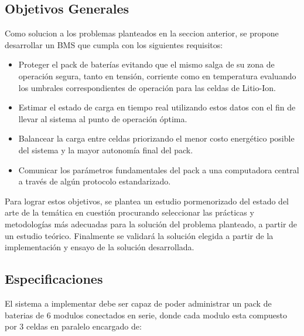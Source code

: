 \documentclass[10pt,a4paper]{article}
\begin{document}
	\subsection{Objetivos Generales}

    Como solucion a los problemas planteados en la seccion anterior, se propone
	desarrollar un BMS que cumpla con los siguientes requisitos:

    \begin{itemize}
        \item Proteger el pack de baterías evitando que el mismo salga de su 
        zona de operación segura, tanto en tensión, corriente como en 
        temperatura evaluando los umbrales correspondientes de operación para 
        las celdas de Litio-Ion.
        \item Estimar el estado de carga en tiempo real utilizando estos datos 
        con el fin de llevar al sistema al punto de operación óptima.
        \item Balancear la carga entre celdas priorizando el menor costo 
        energético posible del sistema y la mayor autonomía final del pack.
        \item Comunicar los parámetros fundamentales del pack a una computadora 
        central a través de algún protocolo estandarizado.
    \end{itemize}

	\noindent Para lograr estos objetivos, se plantea un estudio pormenorizado 
    del estado del arte de la temática en cuestión procurando seleccionar las 
    prácticas y metodologías más adecuadas para la solución del problema 
    planteado, a partir de un estudio teórico. Finalmente se validará la 
    solución elegida a partir de la implementación y ensayo de la solución 
    desarrollada.
	
	\subsection{Especificaciones}

    \noindent El sistema a implementar debe ser capaz de poder administrar un 
    pack de baterias de 6 modulos conectados en serie, donde cada modulo esta 
    compuesto por 3 celdas en paralelo encargado de: 
	
\end{document}
